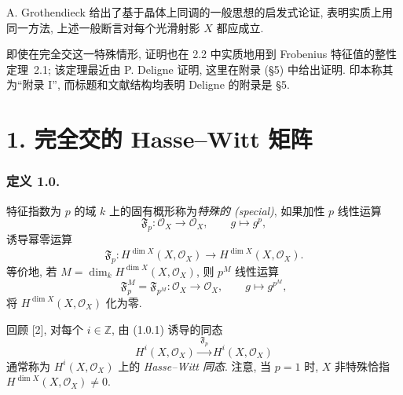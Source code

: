 A. Grothendieck 给出了基于晶体上同调的一般思想的启发式论证,
表明实质上用同一方法, 上述一般断言对每个光滑射影 $X$ 都应成立.

即使在完全交这一特殊情形, 证明也在 2.2 中实质地用到 Frobenius 特征值的整性定理~2.1;
该定理最近由 P. Deligne 证明, 这里在附录 (\S 5) 中给出证明.
印本称其为“附录 I”, 而标题和文献结构均表明 Deligne 的附录是 \S 5.

\section*{1. 完全交的 Hasse--Witt 矩阵}

\subsubsection*{定义 1.0.}
特征指数为 $p$ 的域 $k$ 上的固有概形称为\emph{特殊的 (special)}, 如果加性 $p$ 线性运算
\begin{equation}\tag{1.0.1}
\mathfrak F_p:\mathcal O_X\longrightarrow\mathcal O_X,
\qquad g\longmapsto g^p,
\end{equation}
诱导幂零运算
\begin{equation}\tag{1.0.2}
\mathfrak F_p:H^{\dim X}(X,\mathcal O_X)
\longrightarrow H^{\dim X}(X,\mathcal O_X).
\end{equation}
等价地, 若 $M=\dim_k H^{\dim X}(X,\mathcal O_X)$, 则 $p^M$ 线性运算
\begin{equation}\tag{1.0.3}
\mathfrak F_p^M=\mathfrak F_{p^M}:\mathcal O_X\longrightarrow\mathcal O_X,
\qquad g\longmapsto g^{p^M},
\end{equation}
将 $H^{\dim X}(X,\mathcal O_X)$ 化为零.

回顾 \textup{[2]}, 对每个 $i\in\mathbb Z$, 由 (1.0.1) 诱导的同态
\begin{equation*}
H^i(X,\mathcal O_X)\xrightarrow{\ \mathfrak F_p\ }H^i(X,\mathcal O_X)
\end{equation*}
通常称为 $H^i(X,\mathcal O_X)$ 上的 \emph{Hasse--Witt 同态}.
注意, 当 $p=1$ 时, $X$ 非特殊恰指 $H^{\dim X}(X,\mathcal O_X)\ne0$.
